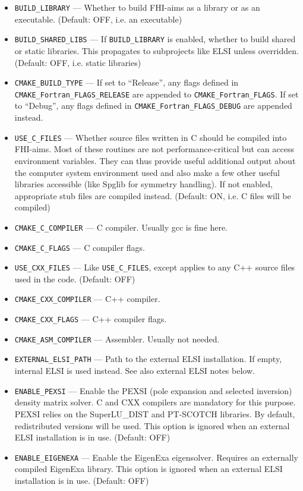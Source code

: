 \begin{itemize}
\item \texttt{BUILD\_LIBRARY} --- Whether to build FHI-aims as a library or as an executable. (Default: OFF, i.e. an executable)
\item \texttt{BUILD\_SHARED\_LIBS} --- If \texttt{BUILD\_LIBRARY} is enabled, whether to build shared or static libraries. This propagates to subprojects like ELSI unless overridden. (Default: OFF, i.e. static libraries)
\item \texttt{CMAKE\_BUILD\_TYPE} --- If set to ``Release'', any flags defined in \\
  \texttt{CMAKE\_Fortran\_FLAGS\_RELEASE} are appended to \texttt{CMAKE\_Fortran\_FLAGS}. If set to ``Debug'', any flags defined in \texttt{CMAKE\_Fortran\_FLAGS\_DEBUG} are appended instead.
\item \texttt{USE\_C\_FILES} ---  Whether source files written in C should be compiled into FHI-aims. Most of these routines are not performance-critical but can access environment variables. They can thus provide useful additional output about the computer system environment used and also make a few other useful libraries accessible (like Spglib for symmetry handling). If not enabled, appropriate stub files are compiled instead. (Default: ON, i.e. C files will be compiled)
\item \texttt{CMAKE\_C\_COMPILER} --- C compiler. Usually gcc is fine here.
\item \texttt{CMAKE\_C\_FLAGS} --- C compiler flags.
\item \texttt{USE\_CXX\_FILES} --- Like \texttt{USE\_C\_FILES}, except applies to any C++ source files used in the code. (Default: OFF)
\item \texttt{CMAKE\_CXX\_COMPILER} --- C++ compiler.
\item \texttt{CMAKE\_CXX\_FLAGS} --- C++ compiler flags.
\item \texttt{CMAKE\_ASM\_COMPILER} --- Assembler. Usually not needed.
\item \texttt{EXTERNAL\_ELSI\_PATH} --- Path to the external ELSI installation. If empty, internal ELSI is used instead. See also external ELSI notes below.
\item \texttt{ENABLE\_PEXSI} --- Enable the PEXSI (pole expansion and selected inversion) density matrix solver. C and CXX compilers are mandatory for this purpose. PEXSI relies on the SuperLU\_DIST and PT-SCOTCH libraries. By default, redistributed versions will be used. This option is ignored when an external ELSI installation is in use. (Default: OFF)
\item \texttt{ENABLE\_EIGENEXA} --- Enable the EigenExa eigensolver. Requires an externally compiled EigenExa library. This option is ignored when an external ELSI installation is in use. (Default: OFF)

\end{itemize}
